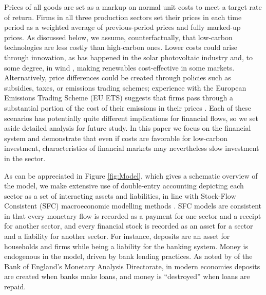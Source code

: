 \documentclass[authoryear]{article}
\begin{document}
Prices of all goods are set as a markup on normal unit costs to meet a target rate of return. Firms in all three production sectors set their prices in each time period as a weighted average of previous-period prices and fully marked-up prices. As discussed below, we assume, counterfactually, that low-carbon technologies are less costly than high-carbon ones. Lower costs could arise through innovation, as has happened in the solar photovoltaic industry and, to some degree, in wind \citep{irena_power_2016}, making renewables cost-effective in some markets. Alternatively, price differences could be created through policies such as subsidies, taxes, or emissions trading schemes; experience with the European Emissions Trading Scheme (EU ETS) suggests that firms pass through a substantial portion of the cost of their emissions in their prices \citep{sijm_co2_2006,zachmann_first_2008}. Each of these scenarios has potentially quite different implications for financial flows, so we set aside detailed analysis for future study. In this paper we focus on the financial system and demonstrate that even if costs are favorable for low-carbon investment, characteristics of financial markets may nevertheless slow investment in the sector.

As can be appreciated in Figure \ref{fig:Model}, which gives a schematic overview of the model, we make extensive use of double-entry accounting depicting each sector as a set of interacting assets and liabilities, in line with Stock-Flow Consistent (SFC) macroeconomic modelling methods \citep{Caverzasi2015, Godley:2007}. SFC models are consistent in that every monetary flow is recorded as a payment for one sector and a receipt for another sector, and every financial stock is recorded as an asset for a sector and a liability for another sector. For instance, deposits are an asset for households and firms while being a liability for the banking system. Money is endogenous in the model, driven by bank lending practices. As noted by \citet{mcleay_money_2014} of the Bank of England's Monetary Analysis Directorate, in modern economies deposits are created when banks make loans, and money is ``destroyed'' when loans are repaid.
\end{document}
